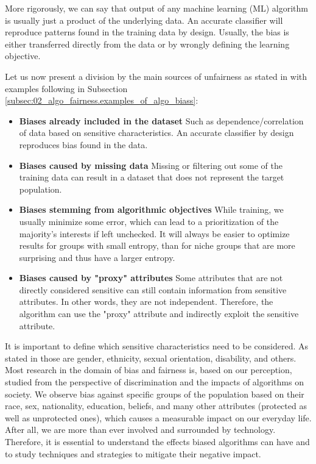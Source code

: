 More rigorously, we can say that output of any machine learning (ML) algorithm is usually just a product of the underlying data. An accurate classifier will reproduce patterns found in the training data by design. Usually, the bias is either transferred directly from the data or by wrongly defining the learning objective.

Let us now present a division by the main sources of unfairness as stated in \cite{pessach2020algorithmic_fairness} with examples following in Subsection \ref{subsec:02_algo_fairness.examples_of_algo_biass}:
\begin{itemize}
    \item \textbf{Biases already included in the dataset}\newline
    Such as dependence/correlation of data based on sensitive characteristics. An accurate classifier by design reproduces bias found in the data.
    \item \textbf{Biases caused by missing data}\newline
    Missing or filtering out some of the training data can result in a dataset that does not represent the target population.
    \item \textbf{Biases stemming from algorithmic objectives}\newline
    While training, we usually minimize some error, which can lead to a prioritization of the majority's interests if left unchecked. It will always be easier to optimize results for groups with small entropy, than for niche groups that are more surprising and thus have a larger entropy.
    \item \textbf{Biases caused by "proxy" attributes}\newline
    Some attributes that are not directly considered sensitive can still contain information from sensitive attributes. In other words, they are not independent. Therefore, the algorithm can use the "proxy" attribute and indirectly exploit the sensitive attribute.
\end{itemize}


It is important to define which sensitive characteristics need to be considered. As stated in \cite{european-union-agency-for-fundamental-rights-2018} those are gender, ethnicity, sexual orientation, disability, and others. Most research in the domain of bias and fairness is, based on our perception, studied from the perspective of discrimination and the impacts of algorithms on society. We observe bias against specific groups of the population based on their race, sex, nationality, education, beliefs, and many other attributes (protected as well as unprotected ones), which causes a measurable impact on our everyday life. After all, we are more than ever involved and surrounded by technology. Therefore, it is essential to understand the effects biased algorithms can have and to study techniques and strategies to mitigate their negative impact.


